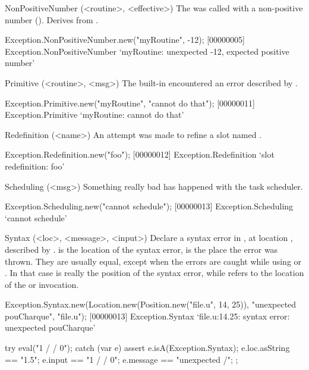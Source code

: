 \begin{urbiscriptapi}
\item[NonPositiveNumber](<routine>, <effective>)
  The  was called with a non-positive number
  ().  Derives from .
\begin{urbiscript}
Exception.NonPositiveNumber.new("myRoutine", -12);
[00000005] Exception.NonPositiveNumber `myRoutine: unexpected -12, expected positive number'
\end{urbiscript}

\item[Primitive](<routine>, <msg>)
  The built-in  encountered an error described by
  .
\begin{urbiscript}
Exception.Primitive.new("myRoutine", "cannot do that");
[00000011] Exception.Primitive `myRoutine: cannot do that'
\end{urbiscript}

\item[Redefinition](<name>)
  An attempt was made to refine a slot named .
\begin{urbiscript}
Exception.Redefinition.new("foo");
[00000012] Exception.Redefinition `slot redefinition: foo'
\end{urbiscript}

\item[Scheduling](<msg>)
  Something really bad has happened with the \urbi task scheduler.
\begin{urbiscript}
Exception.Scheduling.new("cannot schedule");
[00000013] Exception.Scheduling `cannot schedule'
\end{urbiscript}

\item[Syntax](<loc>, <message>, <input>)
  Declare a syntax error in , at location ,
  described by .   is the location of the syntax
  error,  is the place the error was thrown.  They are
  usually equal, except when the errors are caught while using
   or .  In that case
   is really the position of the syntax error, while
   refers to the location of the 
  or  invocation.
\begin{urbiscript}
Exception.Syntax.new(Location.new(Position.new("file.u", 14, 25)),
                     "unexpected pouCharque", "file.u");
[00000013] Exception.Syntax `file.u:14.25: syntax error: unexpected pouCharque'

try
{
  eval("1 / / 0");
}
catch (var e)
{
  assert
  {
    e.isA(Exception.Syntax);
    e.loc.asString == "1.5";
    e.input == "1 / / 0";
    e.message == "unexpected /";
  }
};
\end{urbiscript}



\end{urbiscriptapi}
